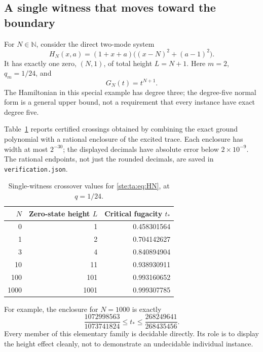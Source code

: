 \documentclass[11pt,letterpaper]{article}
\theoremstyle{definition}
\theoremstyle{remark}
\newcommand{\N}{\mathbb N}
\begin{document}
\subsection{A single witness that moves toward the boundary}
For $N\in\N$, consider the direct two-mode system
\begin{equation}\label{ste:ta:eq:HN}
H_N(x,a)=(1+x+a)\bigl((x-N)^2+(a-1)^2\bigr).
\end{equation}
It has exactly one zero, $(N,1)$, of total height $L=N+1$. Here $m=2$, $q_m=1/24$, and
\[
G_N(t)=t^{N+1}.
\]
The Hamiltonian in this special example has degree three; the degree-five normal form is a general upper bound, not a requirement that every instance have exact degree five.

Table~\ref{ste:ta:tab:critical} reports certified crossings obtained by combining the exact ground polynomial with a rational enclosure of the excited trace. Each enclosure has width at most $2^{-30}$; the displayed decimals have absolute error below $2\times10^{-9}$. The rational endpoints, not just the rounded decimals, are saved in \texttt{verification.json}.
\begin{table}[ht]
\centering
\begin{tabular}{rrr}
\toprule
$N$ & Zero-state height $L$ & Critical fugacity $t_*$\\
\midrule
0 & 1 & 0.458301564\\
1 & 2 & 0.704142627\\
3 & 4 & 0.840894904\\
10 & 11 & 0.938930911\\
100 & 101 & 0.993160652\\
1000 & 1001 & 0.999307785\\
\bottomrule
\end{tabular}
\caption{Single-witness crossover values for \eqref{ste:ta:eq:HN}, at $q=1/24$.}\label{ste:ta:tab:critical}
\end{table}
For example, the enclosure for $N=1000$ is exactly
\[
\frac{1072998563}{1073741824}
\le t_*\le
\frac{268249641}{268435456}.
\]
Every member of this elementary family is decidable directly. Its role is to display the height effect cleanly, not to demonstrate an undecidable individual instance.
\end{document}
